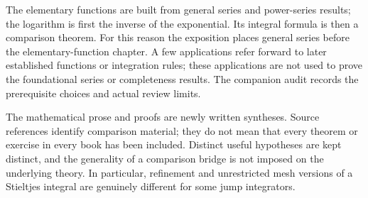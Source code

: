 The elementary functions are built from general series and power-series results;
the logarithm is first the inverse of the exponential. Its integral formula is
then a comparison theorem. For this reason the exposition places general series
before the elementary-function chapter. A few applications refer forward to
later established functions or integration rules; these applications are not
used to prove the foundational series or completeness results. The companion
audit records the prerequisite choices and actual review limits.

The mathematical prose and proofs are newly written syntheses. Source references
identify comparison material; they do not mean that every theorem or exercise in
every book has been included. Distinct useful hypotheses are kept distinct, and
the generality of a comparison bridge is not imposed on the underlying theory.
In particular, refinement and unrestricted mesh versions of a Stieltjes integral
are genuinely different for some jump integrators.
